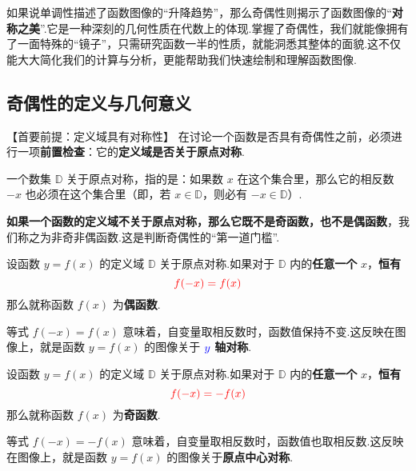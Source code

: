 如果说单调性描述了函数图像的“升降趋势”，那么奇偶性则揭示了函数图像的“\textbf{对称之美}”.它是一种深刻的几何性质在代数上的体现.掌握了奇偶性，我们就能像拥有了一面特殊的“镜子”，只需研究函数一半的性质，就能洞悉其整体的面貌.这不仅能大大简化我们的计算与分析，更能帮助我们快速绘制和理解函数图像.

\subsection{奇偶性的定义与几何意义}

【首要前提：定义域具有对称性】
在讨论一个函数是否具有奇偶性之前，必须进行一项\textbf{前置检查}：它的\textbf{定义域是否关于原点对称}.
	
一个数集 $\mathbb{D}$ 关于原点对称，指的是：如果数 $x$ 在这个集合里，那么它的相反数 $-x$ 也必须在这个集合里（即，若 $x \in \mathbb{D}$，则必有 $-x \in \mathbb{D}$）.
	
\textbf{如果一个函数的定义域不关于原点对称，那么它既不是奇函数，也不是偶函数}，我们称之为非奇非偶函数.这是判断奇偶性的“第一道门槛”.


\begin{definition}[偶函数]
	设函数 $y=f(x)$ 的定义域 $\mathbb{D}$ 关于原点对称.如果对于 $\mathbb{D}$ 内的\textbf{任意一个} $x$，\textbf{恒有}
	\begin{equation}
		\textcolor{red}{f(-x) = f(x)}
	\end{equation}
	那么就称函数 $f(x)$ 为\textbf{偶函数}.
\end{definition}

\begin{note}[偶函数的几何意义]
	等式 $f(-x)=f(x)$ 意味着，自变量取相反数时，函数值保持不变.这反映在图像上，就是函数 $y=f(x)$ 的图像关于 $\textcolor{blue}{y}$ \textbf{轴对称}.
\end{note}

\begin{definition}[奇函数]
	设函数 $y=f(x)$ 的定义域 $\mathbb{D}$ 关于原点对称.如果对于 $\mathbb{D}$ 内的\textbf{任意一个} $x$，\textbf{恒有}
	\begin{equation}
		\textcolor{red}{f(-x) = -f(x)}
	\end{equation}
	那么就称函数 $f(x)$ 为\textbf{奇函数}.
\end{definition}

\begin{note}[奇函数的几何意义]
	等式 $f(-x)=-f(x)$ 意味着，自变量取相反数时，函数值也取相反数.这反映在图像上，就是函数 $y=f(x)$ 的图像关于\textbf{原点中心对称}.
\end{note}

